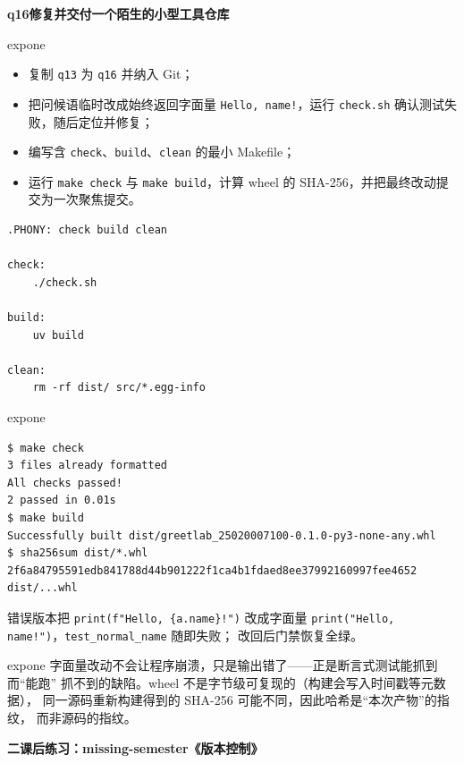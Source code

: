 \documentclass[11pt,a4paper,fontset=none]{ctexart}
\newcommand{\partbanner}[3]{%
  \par\vspace{1.6em}
  \begin{tcolorbox}[enhanced, colback=#1!10, colframe=#1!85!black,
    boxrule=1pt, arc=3pt, left=8pt, right=8pt, top=6pt, bottom=6pt,
    before skip=1.6em]
    {\Large\bfseries\color{#1!70!black}#2\qquad #3}
  \end{tcolorbox}
  \par\vspace{0.2em}\noindent\ignorespaces
}
\newcommand{\hwbanner}[3]{%
  \par\vspace{1.1em}
  \begin{tcolorbox}[enhanced, colback=#1!8, colframe=#1!75!black,
    boxrule=0.8pt, arc=2pt, left=7pt, right=7pt, top=4pt, bottom=4pt,
    before skip=1.1em]
    {\bfseries\color{#1!75!black}#2\qquad #3}
  \end{tcolorbox}
  \par\vspace{0.1em}\noindent\ignorespaces
}
\newcommand{\sublabel}[2]{%
  \par\vspace{0.8em}\noindent{\bfseries\color{#1!75!black}#2}\par\nobreak\vspace{0.25em}\noindent\ignorespaces
}
\begin{document}
\hwbanner{expone}{q16}{修复并交付一个陌生的小型工具仓库}
\begin{reqbox}{expone}
\begin{itemize}[leftmargin=1.4em, itemsep=1pt]
  \item 复制 \texttt{q13} 为 \texttt{q16} 并纳入 Git；
  \item 把问候语临时改成始终返回字面量 \texttt{Hello, name!}，运行 \texttt{check.sh} 确认测试失败，随后定位并修复；
  \item 编写含 \texttt{check}、\texttt{build}、\texttt{clean} 的最小 Makefile；
  \item 运行 \texttt{make check} 与 \texttt{make build}，计算 wheel 的 SHA-256，并把最终改动提交为一次聚焦提交。
\end{itemize}
\end{reqbox}
\sublabel{expone}{\faCode\ Makefile 与构建校验（\texttt{q16/}）}
\begin{lstlisting}[style=shell]
.PHONY: check build clean

check:
	./check.sh

build:
	uv build

clean:
	rm -rf dist/ src/*.egg-info
\end{lstlisting}
\begin{resbox}{expone}
\begin{lstlisting}[style=output]
$ make check
3 files already formatted
All checks passed!
2 passed in 0.01s
$ make build
Successfully built dist/greetlab_25020007100-0.1.0-py3-none-any.whl
$ sha256sum dist/*.whl
2f6a84795591edb841788d44b901222f1ca4b1fdaed8ee37992160997fee4652  dist/...whl
\end{lstlisting}
错误版本把 \texttt{print(f"Hello, \{a.name\}!")} 改成字面量
\texttt{print("Hello, name!")}，\texttt{test\_normal\_name} 随即失败；
改回后门禁恢复全绿。
\end{resbox}
\begin{trapbox}{expone}
  字面量改动不会让程序崩溃，只是输出错了——正是断言式测试能抓到而“能跑”
  抓不到的缺陷。wheel 不是字节级可复现的（构建会写入时间戳等元数据），
  同一源码重新构建得到的 SHA-256 可能不同，因此哈希是“本次产物”的指纹，
  而非源码的指纹。
\end{trapbox}

\partbanner{exptwo}{二}{课后练习：missing-semester《版本控制》}
\end{document}
